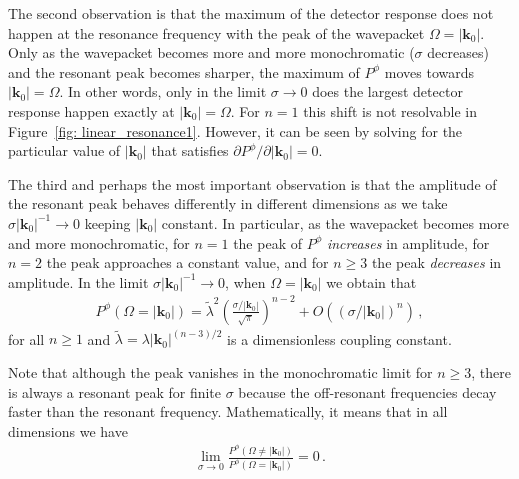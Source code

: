 \documentclass[11pt,prd,onecolumn,superscriptaddress,nofootinbib,floatfix,amsmath,amssymb]{revtex4-2}
\newcommand{\bk}{{\bm{k}}}
\newcommand{\rr}[1]{\left(#1\right)}
\begin{document}
    
    
    The second observation is that the maximum of the detector response does not happen at the resonance frequency with the peak of the wavepacket $\Omega=|\bm k_0|$. Only as the wavepacket becomes more and more monochromatic ($\sigma$ decreases) and the resonant peak becomes sharper, the maximum of $P^\phi$ moves towards $|\bk_0|=\Omega$. In other words, only in the limit $\sigma\to 0$  does the largest detector response happen exactly at $|\bk_0|=\Omega$. For $n=1$ this shift is not resolvable in  Figure~\ref{fig: linear_resonance1}. However, it can be seen by solving for the particular value of $|\bk_0|$ that satisfies $\partial P^\phi/\partial |\bk_0| = 0$. 
    	
    The third and perhaps the most important observation is that the amplitude of the resonant peak behaves differently in different dimensions as we take $\sigma|\bk_0|^{-1}\to 0$ keeping $|\bm k_0|$ constant. In particular, as the wavepacket becomes more and more monochromatic, for $n=1$ the peak of $P^\phi$ \textit{increases} in amplitude, for $n=2$ the peak approaches a constant value, and for $n\geq 3$ the peak \textit{decreases} in amplitude.  In the limit $\sigma|\bk_0|^{-1}\to 0$, when $\Omega=|\bk_0|$ we obtain that
    \begin{align}
        P^\phi(\Omega=|\bk_0|) = \tilde\lambda^2 \rr{\frac{\sigma/|\bk_0|}{\sqrt{\pi}}}^{n-2}+O((\sigma/|\bk_0|)^{n})\,,
    \end{align}
    for all $n\geq 1$ and $\tilde\lambda= \lambda|\bk_0|^{(n-3)/2}$ is a dimensionless coupling constant. %
   
    
    Note that although the peak vanishes in the monochromatic limit for $n\geq 3$, there is always a resonant peak for finite $\sigma$ because the off-resonant frequencies decay faster than the resonant frequency. Mathematically, it means that in all dimensions we have
    \begin{align}
        \lim_{\sigma\to 0}
        \frac{P^\phi(\Omega\neq |\bk_0|)}{P^\phi(\Omega=|\bk_0|)} = 0\,.
    \end{align}
    	
\end{document}
